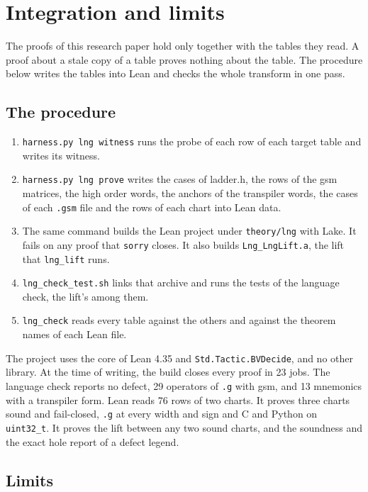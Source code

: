 \chapter{Integration and limits}
\label{ch:integration}

The proofs of this research paper hold only together with the tables they read. A proof about a stale copy of a
table proves nothing about the table. The procedure below writes the tables into Lean and checks the whole
transform in one pass.

\section{The procedure}

\begin{enumerate}
  \item \texttt{harness.py lng witness} runs the probe of each row of each target table and writes its witness.
  \item \texttt{harness.py lng prove} writes the cases of ladder.h, the rows of the gsm matrices, the high order
        words, the anchors of the transpiler words, the cases of each \texttt{.gsm} file and the rows of each chart
        into Lean data.
  \item The same command builds the Lean project under \texttt{theory/lng} with Lake. It fails on any proof that
        \texttt{sorry} closes. It also builds \texttt{Lng\_LngLift.a}, the lift that \texttt{lng\_lift} runs.
  \item \texttt{lng\_check\_test.sh} links that archive and runs the tests of the language check, the lift's among
        them.
  \item \texttt{lng\_check} reads every table against the others and against the theorem names of each Lean file.
\end{enumerate}

The project uses the core of Lean 4.35 and \texttt{Std.Tactic.BVDecide}, and no other library. At the time of
writing, the build closes every proof in 23 jobs. The language check reports no defect, 29 operators of
\texttt{.g} with gsm, and 13 mnemonics with a transpiler form. Lean reads 76 rows of two charts. It proves three
charts sound and fail-closed, \texttt{.g} at every width and sign and C and Python on \texttt{uint32\_t}. It
proves the lift between any two sound charts, and the soundness and the exact hole report of a defect legend.

\section{Limits}

